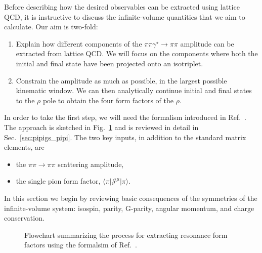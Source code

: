 Before describing how the desired observables can be extracted using lattice QCD, it is instructive to discuss the infinite-volume quantities that we aim to calculate. Our aim is two-fold:
	\begin{enumerate}
	\item Explain how different components of the $\pi\pi\gamma^\star\to\pi\pi$ amplitude can be extracted from lattice QCD. We will focus on the components where both the initial and final state have been projected onto an isotriplet. 
	\item Constrain the amplitude as much as possible, in the largest possible kinematic window. We can then analytically continue initial and final states to the $\rho$ pole to obtain the four form factors of the $\rho$. 
	\end{enumerate}

	In order to take the first step, we will need the formalism introduced in Ref.~\cite{Briceno:2015tza}. The approach is sketched in Fig.~\ref{fig:flowchart} and is reviewed in detail in Sec.~\ref{sec:pipigs_pipi}. The two key inputs, in addition to the standard matrix elements, are 
	\begin{itemize}
	\item the $\pi\pi\to\pi\pi$ scattering amplitude,
	\item the single pion form factor, $\langle \pi \vert \mathcal J^\mu \vert \pi \rangle$.
	\end{itemize}
	
	In this section we begin by reviewing basic consequences of the symmetries of the infinite-volume system: isospin, parity, G-parity, angular momentum, and charge conservation. 
	
\begin{figure}[t]
\begin{center}
\caption{Flowchart summarizing the process for extracting resonance form factors using the formalsim of Ref.~\cite{Briceno:2015tza}. {}}\label{fig:flowchart}
\end{center}
\end{figure}

